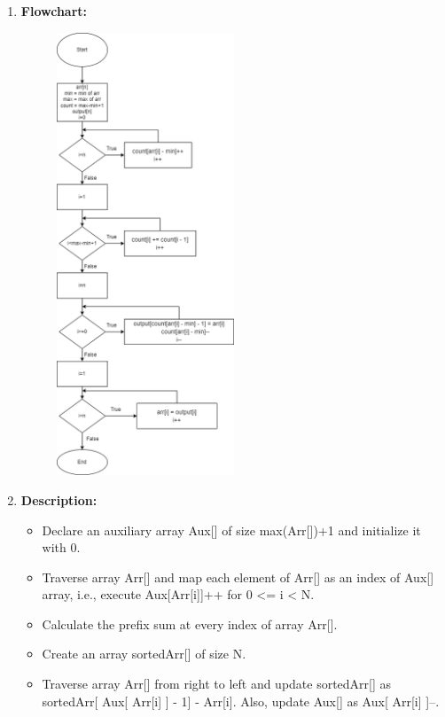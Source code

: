 \documentclass[11pt,a4paper]{article}
\begin{document}
{\begin{enumerate}[label=\textbf{\arabic*})]
\begin{algorithm}
\begin{algorithmic}[1]
            				\State  b[c[a[j]]-1] = a[j]
            				\State c[a[j]] = c[a[j]] - 1
            			\EndFor
            		\EndProcedure
            	\end{algorithmic}
            \end{algorithm}
				\item \textbf{Flowchart:}
					\begin{figure}[H]
						\centering 
						\includegraphics[width=0.5\textwidth]{CountingSort Flowchart}
					\end{figure}
					
				\item \textbf{Description:}
				\begin{itemize}
					\item 	Declare an auxiliary array Aux[] of size max(Arr[])+1 and initialize it with 0.
					\item Traverse array Arr[] and map each element of Arr[] as an index of Aux[] array, i.e., execute Aux[Arr[i]]++ for 0 <= i < N.  
					\item Calculate the prefix sum at every index of array Arr[]. 
					\item Create an array sortedArr[] of size N.
					\item Traverse array Arr[] from right to left and update sortedArr[] as sortedArr[ Aux[ Arr[i] ] - 1] - Arr[i]. Also, update Aux[] as  Aux[ Arr[i] ]--.
				\end{itemize}
				

\end{enumerate}}
\end{document}
